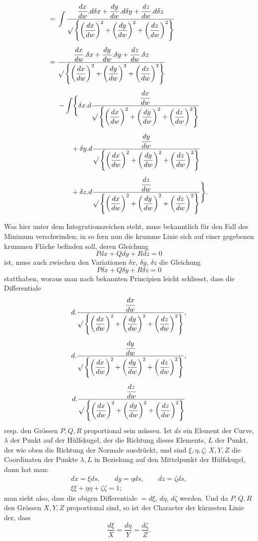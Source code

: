 %
\[
\begin{aligned}
={}&\int\frac{\dfrac{dx}{dw}.d\delta x+\dfrac{dy}{dw}.d\delta y+\dfrac{dz}{dw}.d\delta z}{\mathord{\surd}\left\{\left(\dfrac{dx}{dw}\right)^{2}+\left(\dfrac{dy}{dw}\right)^{2}+\left(\dfrac{dz}{dw}\right)^{2}\right\}}\\[5pt]
={}&\frac{\dfrac{dx}{dw}.\delta x+\dfrac{dy}{dw}.\delta y+\dfrac{dz}{dw}.\delta z}{\mathord{\surd}\left\{\left(\dfrac{dx}{dw}\right)^{2}+\left(\dfrac{dy}{dw}\right)^{2}+\left(\dfrac{dz}{dw}\right)^{2}\right\}}\\[5pt]
&-\int\Biggl\{\delta x.d\frac{\dfrac{dx}{dw}}{\mathord{\surd}\left\{\left(\dfrac{dx}{dw}\right)^{2}+\left(\dfrac{dy}{dw}\right)^{2}+\left(\dfrac{dz}{dw}\right)^{2}\right\}}\\[5pt]
&\qquad+\delta y.d\frac{\dfrac{dy}{dw}}{\mathord{\surd}\left\{\left(\dfrac{dx}{dw}\right)^{2}+\left(\dfrac{dy}{dw}\right)^{2}+\left(\dfrac{dz}{dw}\right)^{2}\right\}}\\[5pt]
&\qquad+\delta z.d\frac{\dfrac{dz}{dw}}{\mathord{\surd}\left\{\left(\dfrac{dx}{dw}\right)^{2}+\left(\dfrac{dy}{dw}\right)^{2}+\left(\dfrac{dz}{dw}\right)^{2}\right\}}\Biggr\}.
\end{aligned}
\]

Was hier unter dem Integrationszeichen steht, muss bekanntlich für den Fall des Minimum verschwinden; in so fern nun die krumme Linie sich auf einer gegebenen krummen Fläche befinden soll, deren Gleichung
\[
Pdx+Qdy+Rdz=0
\]
ist, muss auch zwischen den Variationen $\delta x$, $\delta y$, $\delta z$ die Gleichung
\[
P\delta x+Q\delta y+R\delta z=0
\]
statthaben, woraus man nach bekannten Principien leicht schliesst, dass die Differentiale
\[
\begin{gathered}
d.\frac{\dfrac{dx}{dw}}{\mathord{\surd}\left\{\left(\dfrac{dx}{dw}\right)^{2}+\left(\dfrac{dy}{dw}\right)^{2}+\left(\dfrac{dz}{dw}\right)^{2}\right\}},\\[5pt]
d.\frac{\dfrac{dy}{dw}}{\mathord{\surd}\left\{\left(\dfrac{dx}{dw}\right)^{2}+\left(\dfrac{dy}{dw}\right)^{2}+\left(\dfrac{dz}{dw}\right)^{2}\right\}},\\[5pt]
d.\frac{\dfrac{dz}{dw}}{\mathord{\surd}\left\{\left(\dfrac{dx}{dw}\right)^{2}+\left(\dfrac{dy}{dw}\right)^{2}+\left(\dfrac{dz}{dw}\right)^{2}\right\}}
\end{gathered}
\]
resp. den Grössen $P,Q,R$ proportional sein müssen. Ist $ds$ ein Element der Curve, $\lambda$ der Punkt auf der Hülfskugel, der die Richtung dieses Elements, $L$ der Punkt, der wie oben die Richtung der Normale ausdrückt, und sind $\xi,\eta,\zeta$; $X,Y,Z$ die Coordinaten der Punkte $\lambda,L$ in Beziehung auf den Mittelpunkt der Hülfskugel, dann hat man:
\[
\begin{gathered}
dx=\xi ds,\qquad dy=\eta ds,\qquad dz=\zeta ds,\\
\xi\xi+\eta\eta+\zeta\zeta=1;
\end{gathered}
\]
man sieht also, dass die obigen Differentiale $=d\xi$, $d\eta$, $d\zeta$ werden. Und da $P,Q,R$ den Grössen $X,Y,Z$ proportional sind, so ist der Character der kürzesten Linie der, dass
\[
\frac{d\xi}{X}=\frac{d\eta}{Y}=\frac{d\zeta}{Z}.
\]
